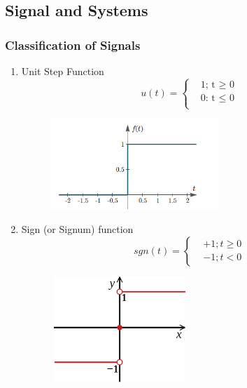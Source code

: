 \documentclass{article}
\begin{document}
\newpage

\subsection{Signal and Systems}
\subsubsection{Classification of Signals}   
\begin{enumerate}
    \item Unit Step Function
    \begin{equation}
    u(t) = 
        \begin{cases}
             & \text{1; t $\geq$ 0}\\
             & \text{0: t $\leq$ 0}\\
        \end{cases}
    \end{equation}
    \begin{figure}[h]
        \centering
        \includegraphics[width=0.6\textwidth]{image/image.png}
        \label{fig:enter-label}
    \end{figure}
    \item Sign (or Signum) function
    \begin{equation}
    sgn(t) = 
        \begin{cases}
            & +1; t \geq 0 \\
            & -1; t < 0
        \end{cases}
    \end{equation}
    \begin{figure}[h]
        \centering
        \includegraphics[width=0.5\textwidth, height=4cm]{image/Signum_function.svg.png}

\end{figure}
\end{enumerate}
\end{document}
